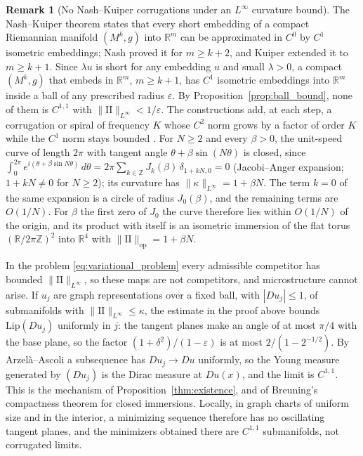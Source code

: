 \documentclass[11pt,reqno]{amsart}
\theoremstyle{definition}
\newtheorem{remark}[theorem]{Remark}
\providecommand{\R}{\mathbb{R}}
\providecommand{\II}{\mathrm{I\!I}}
\newcommand{\op}{\mathrm{op}}
\numberwithin{equation}{section}
\providecommand{\II}{\mathrm{II}}
\providecommand{\R}{\mathbb{R}}
\begin{document}
\begin{remark}[No Nash--Kuiper corrugations under an $L^\infty$ curvature bound]
\label{rem:nash_kuiper}
The Nash--Kuiper theorem \cite{nash1954, kuiper1955a, kuiper1955b} states that every short embedding of a compact Riemannian manifold $(M^k, g)$ into $\R^m$ can be approximated in $C^0$ by $C^1$ isometric embeddings; Nash proved it for $m \ge k+2$, and Kuiper extended it to $m \ge k+1$. Since $\lambda u$ is short for any embedding $u$ and small $\lambda > 0$, a compact $(M^k, g)$ that embeds in $\R^m$, $m \ge k+1$, has $C^1$ isometric embeddings into $\R^m$ inside a ball of any prescribed radius $\varepsilon$. By Proposition~\ref{prop:ball_bound}, none of them is $C^{1,1}$ with $\|\II\|_{L^\infty} < 1/\varepsilon$. The constructions add, at each step, a corrugation or spiral of frequency $K$ whose $C^2$ norm grows by a factor of order $K$ while the $C^1$ norm stays bounded \cite[Section~3]{conti2012}. For $N \ge 2$ and every $\beta > 0$, the unit-speed curve of length $2\pi$ with tangent angle $\theta + \beta\sin(N\theta)$ is closed, since $\int_0^{2\pi} e^{i(\theta + \beta\sin N\theta)}\,d\theta = 2\pi\sum_{k \in \mathbb{Z}} J_k(\beta)\,\delta_{1+kN,0} = 0$ (Jacobi--Anger expansion; $1 + kN \ne 0$ for $N \ge 2$); its curvature has $\|\kappa\|_{L^\infty} = 1 + \beta N$. The term $k = 0$ of the same expansion is a circle of radius $J_0(\beta)$, and the remaining terms are $O(1/N)$. For $\beta$ the first zero of $J_0$ the curve therefore lies within $O(1/N)$ of the origin, and its product with itself is an isometric immersion of the flat torus $(\R/2\pi\mathbb{Z})^2$ into $\R^4$ with $\|\II\|_{\op} = 1 + \beta N$.

In the problem \eqref{eq:variational_problem} every admissible competitor has bounded $\|\II\|_{L^\infty}$, so these maps are not competitors, and microstructure cannot arise. If $u_j$ are graph representations over a fixed ball, with $|Du_j| \le 1$, of submanifolds with $\|\II\|_{L^\infty} \le \kappa$, the estimate in the proof above bounds $\mathrm{Lip}(Du_j)$ uniformly in $j$: the tangent planes make an angle of at most $\pi/4$ with the base plane, so the factor $(1+\delta^2)/(1-\varepsilon)$ is at most $2/(1 - 2^{-1/2})$. By Arzel\`a--Ascoli a subsequence has $Du_j \to Du$ uniformly, so the Young measure generated by $(Du_j)$ is the Dirac measure at $Du(x)$, and the limit is $C^{1,1}$. This is the mechanism of Proposition~\ref{thm:existence}, and of Breuning's compactness theorem \cite{breuning2015} for closed immersions. Locally, in graph charts of uniform size and in the interior, a minimizing sequence therefore has no oscillating tangent planes, and the minimizers obtained there are $C^{1,1}$ submanifolds, not corrugated limits.


\end{remark}
\end{document}
